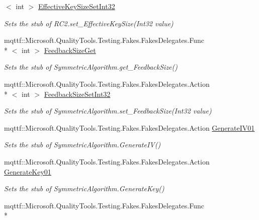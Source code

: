 \begin{DoxyCompactItemize}
$<$ int $>$ \hyperlink{class_system_1_1_security_1_1_cryptography_1_1_fakes_1_1_stub_r_c2_a678d91abdb7e5efa0b8ae54bf7ced7c7}{Effective\-Key\-Size\-Set\-Int32}
\begin{DoxyCompactList}\small\item\em Sets the stub of R\-C2.\-set\-\_\-\-Effective\-Key\-Size(\-Int32 value)\end{DoxyCompactList}\item 
mqttf\-::\-Microsoft.\-Quality\-Tools.\-Testing.\-Fakes.\-Fakes\-Delegates.\-Func\\*
$<$ int $>$ \hyperlink{class_system_1_1_security_1_1_cryptography_1_1_fakes_1_1_stub_r_c2_aee6ed454ca364341899bbe8a6ce1a627}{Feedback\-Size\-Get}
\begin{DoxyCompactList}\small\item\em Sets the stub of Symmetric\-Algorithm.\-get\-\_\-\-Feedback\-Size()\end{DoxyCompactList}\item 
mqttf\-::\-Microsoft.\-Quality\-Tools.\-Testing.\-Fakes.\-Fakes\-Delegates.\-Action\\*
$<$ int $>$ \hyperlink{class_system_1_1_security_1_1_cryptography_1_1_fakes_1_1_stub_r_c2_a52ed66568cd81935e62afbaa2fcb8eea}{Feedback\-Size\-Set\-Int32}
\begin{DoxyCompactList}\small\item\em Sets the stub of Symmetric\-Algorithm.\-set\-\_\-\-Feedback\-Size(\-Int32 value)\end{DoxyCompactList}\item 
mqttf\-::\-Microsoft.\-Quality\-Tools.\-Testing.\-Fakes.\-Fakes\-Delegates.\-Action \hyperlink{class_system_1_1_security_1_1_cryptography_1_1_fakes_1_1_stub_r_c2_a6e79e91c68e5865f344e18aa15ac9922}{Generate\-I\-V01}
\begin{DoxyCompactList}\small\item\em Sets the stub of Symmetric\-Algorithm.\-Generate\-I\-V()\end{DoxyCompactList}\item 
mqttf\-::\-Microsoft.\-Quality\-Tools.\-Testing.\-Fakes.\-Fakes\-Delegates.\-Action \hyperlink{class_system_1_1_security_1_1_cryptography_1_1_fakes_1_1_stub_r_c2_a01373f4d76b4a842edf7512b8d32722c}{Generate\-Key01}
\begin{DoxyCompactList}\small\item\em Sets the stub of Symmetric\-Algorithm.\-Generate\-Key()\end{DoxyCompactList}\item 
mqttf\-::\-Microsoft.\-Quality\-Tools.\-Testing.\-Fakes.\-Fakes\-Delegates.\-Func\\*

\end{DoxyCompactItemize}
